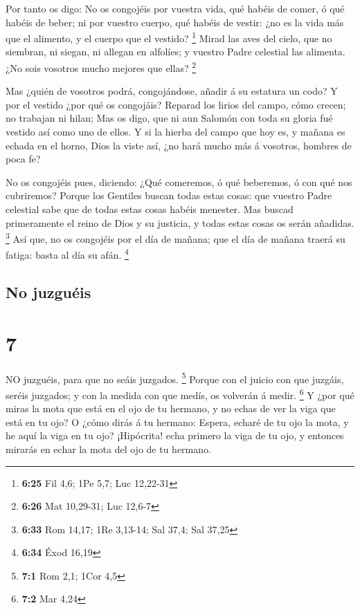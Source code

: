  Por tanto os digo: No os congojéis por vuestra vida, qué
habéis de comer, ó qué habéis de beber; ni por vuestro cuerpo, qué
habéis de vestir: ¿no es la vida más que el alimento, y el cuerpo que el
vestido? \footnote{\textbf{6:25} Fil 4,6; 1Pe 5,7; Luc 12,22-31}
 Mirad las aves del cielo, que no siembran, ni siegan, ni
allegan en alfolíes; y vuestro Padre celestial las alimenta. ¿No sois
vosotros mucho mejores que ellas? \footnote{\textbf{6:26} Mat 10,29-31;
  Luc 12,6-7}

 Mas ¿quién de vosotros podrá, congojándose, añadir á su
estatura un codo?  Y por el vestido ¿por qué os congojáis?
Reparad los lirios del campo, cómo crecen; no trabajan ni hilan;
 Mas os digo, que ni aun Salomón con toda su gloria fué
vestido así como uno de ellos.  Y si la hierba del campo
que hoy es, y mañana es echada en el horno, Dios la viste así, ¿no hará
mucho más á vosotros, hombres de poca fe?

 No os congojéis pues, diciendo: ¿Qué comeremos, ó qué
beberemos, ó con qué nos cubriremos?  Porque los Gentiles
buscan todas estas cosas: que vuestro Padre celestial sabe que de todas
estas cosas habéis menester.  Mas buscad primeramente el
reino de Dios y su justicia, y todas estas cosas os serán añadidas.
\footnote{\textbf{6:33} Rom 14,17; 1Re 3,13-14; Sal 37,4; Sal 37,25}
 Así que, no os congojéis por el día de mañana; que el día
de mañana traerá su fatiga: basta al día su afán. \footnote{\textbf{6:34}
  Éxod 16,19}

\hypertarget{no-juzguuxe9is}{%
\subsection{No juzguéis}\label{no-juzguuxe9is}}

\hypertarget{section-6}{%
\section{7}\label{section-6}}

 NO juzguéis, para que no seáis juzgados. \footnote{\textbf{7:1}
  Rom 2,1; 1Cor 4,5}  Porque con el juicio con que juzgáis,
seréis juzgados; y con la medida con que medís, os volverán á medir.
\footnote{\textbf{7:2} Mar 4,24}  Y ¿por qué miras la mota
que está en el ojo de tu hermano, y no echas de ver la viga que está en
tu ojo?  O ¿cómo dirás á tu hermano: Espera, echaré de tu
ojo la mota, y he aquí la viga en tu ojo?  ¡Hipócrita! echa
primero la viga de tu ojo, y entonces mirarás en echar la mota del ojo
de tu hermano.

